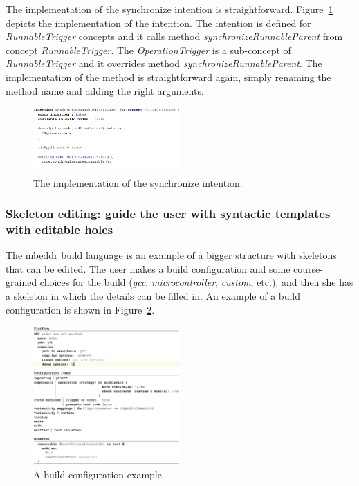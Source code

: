 \documentclass[preprint,numbers,10pt]{sigplanconf}
\begin{document}
The implementation of the synchronize intention is straightforward. Figure~\ref{fig:synchronizeRunnable}
depicts the implementation of the intention. The intention is defined for \emph{RunnableTrigger} concepts
and it calls method \emph{synchronizeRunnableParent} from concept \emph{RunnableTrigger}. The \emph{OperationTrigger}
is a sub-concept of \emph{RunnableTrigger} and it overrides method \emph{synchronizeRunnableParent}. The implementation
of the method is straightforward again, simply renaming the method name and adding the right arguments.

\begin{figure}[H]
	\centering
	\includegraphics[width=0.50\textwidth]{screens/synchronizeRunnableWithTrigger.png}
	\caption{The implementation of the synchronize intention.}
	\label{fig:synchronizeRunnable}
\end{figure}
\subsubsection{Skeleton editing: guide the user with syntactic templates with editable holes}
The mbeddr build language is an example of a bigger structure with skeletons that can be edited.
The user makes a build configuration and some course-grained choices for the build (\emph{gcc}, \emph{microcontroller}, \emph{custom}, etc.),
and then she has a skeleton in which the details can be filled in. An example of a build configuration is shown in Figure~\ref{fig:buildConfigExample}.

\begin{figure}[H]
	\centering
	\includegraphics[width=0.50\textwidth]{screens/BuildConfigExample.png}
	\caption{A build configuration example.}
	\label{fig:buildConfigExample}
\end{figure}
\end{document}
